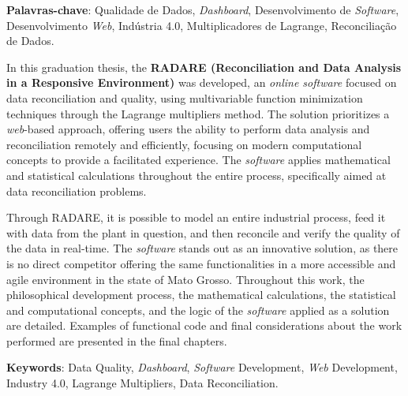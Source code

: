 \vspace{1.5ex}

{\bf Palavras-chave}: Qualidade de Dados, \textit{Dashboard}, Desenvolvimento de \textit{Software}, Desenvolvimento \textit{Web}, Indústria 4.0, Multiplicadores de Lagrange, Reconciliação de Dados.


%
%

In this graduation thesis, the \textbf{RADARE (Reconciliation and Data Analysis in a Responsive Environment)} was developed, an \textit{online software} focused on data reconciliation and quality, using multivariable function minimization techniques through the Lagrange multipliers method. The solution prioritizes a \textit{web}-based approach, offering users the ability to perform data analysis and reconciliation remotely and efficiently, focusing on modern computational concepts to provide a facilitated experience. The \textit{software} applies mathematical and statistical calculations throughout the entire process, specifically aimed at data reconciliation problems.

Through RADARE, it is possible to model an entire industrial process, feed it with data from the plant in question, and then reconcile and verify the quality of the data in real-time. The \textit{software} stands out as an innovative solution, as there is no direct competitor offering the same functionalities in a more accessible and agile environment in the state of Mato Grosso. Throughout this work, the philosophical development process, the mathematical calculations, the statistical and computational concepts, and the logic of the \textit{software} applied as a solution are detailed. Examples of functional code and final considerations about the work performed are presented in the final chapters.

\vspace{1.5ex}

{\bf Keywords}: Data Quality, \textit{Dashboard}, \textit{Software} Development, \textit{Web} Development, Industry 4.0, Lagrange Multipliers, Data Reconciliation.
